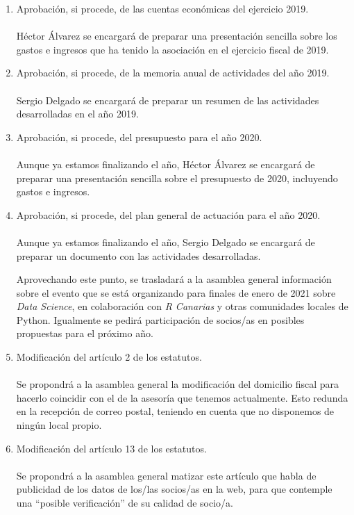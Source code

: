 \documentclass[a4paper, 12pt]{article}
\begin{document}
\begin{enumerate}
    \item Aprobación, si procede, de las cuentas económicas del ejercicio 2019. \\ \\
    Héctor Álvarez se encargará de preparar una presentación sencilla sobre los gastos e ingresos que ha tenido la asociación en el ejercicio fiscal de 2019.

    \item Aprobación, si procede, de la memoria anual de actividades del año 2019. \\ \\
    Sergio Delgado se encargará de preparar un resumen de las actividades desarrolladas en el año 2019.
    
    \item Aprobación, si procede, del presupuesto para el año 2020. \\ \\
    Aunque ya estamos finalizando el año, Héctor Álvarez se encargará de preparar una presentación sencilla sobre el presupuesto de 2020, incluyendo gastos e ingresos.
    
    \item Aprobación, si procede, del plan general de actuación para el año 2020. \\ \\
    Aunque ya estamos finalizando el año, Sergio Delgado se encargará de preparar un documento con las actividades desarrolladas.

    Aprovechando este punto, se trasladará a la asamblea general información sobre el evento que se está organizando para finales de enero de 2021 sobre \textit{Data Science}, en colaboración con \textit{R Canarias} y otras comunidades locales de Python. Igualmente se pedirá participación de socios/as en posibles propuestas para el próximo año.
    
    \item Modificación del artículo 2 de los estatutos. \\ \\
    Se propondrá a la asamblea general la modificación del domicilio fiscal para hacerlo coincidir con el de la asesoría que tenemos actualmente. Esto redunda en la recepción de correo postal, teniendo en cuenta que no disponemos de ningún local propio.

    \item Modificación del artículo 13 de los estatutos. \\ \\
    Se propondrá a la asamblea general matizar este artículo que habla de publicidad de los datos de los/las socios/as en la web, para que contemple una ``posible verificación'' de su calidad de socio/a.
    

\end{enumerate}
\end{document}
